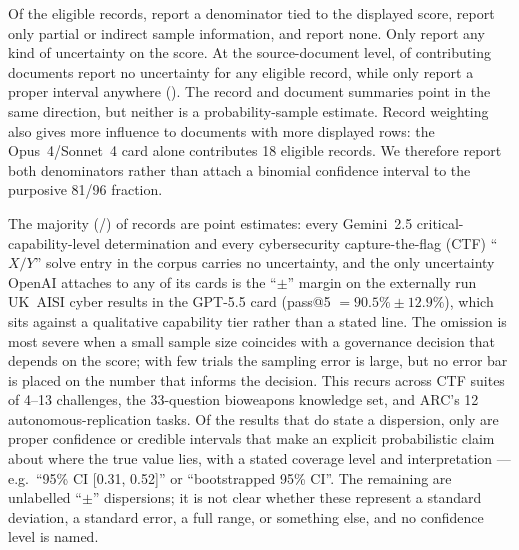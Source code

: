 \documentclass{article}
\begin{document}



Of the \CensusTotal{} eligible records, \CensusScoreN{} report a denominator tied to the displayed score, \CensusPartialN{} report only partial or indirect sample information, and \CensusNoN{} report none. Only \CensusUncertainty{} report any kind of uncertainty on the score. At the source-document level, \CensusSourceNoUncertainty{} of \CensusSourceDocs{} contributing documents report no uncertainty for any eligible record, while only \CensusSourceInterval{} report a proper interval anywhere (). The record and document summaries point in the same direction, but neither is a probability-sample estimate. Record weighting also gives more influence to documents with more displayed rows: the Opus~4/Sonnet~4 card alone contributes 18 eligible records. We therefore report both denominators rather than attach a binomial confidence interval to the purposive 81/96 fraction.

The majority (\CensusNoUncertainty{}/\CensusTotal{}) of records are point estimates: every Gemini~2.5 critical-capability-level determination and every cybersecurity capture-the-flag (CTF) ``$X/Y$'' solve entry in the corpus carries no uncertainty, and the only uncertainty OpenAI
attaches to any of its cards is the ``$\pm$'' margin on the externally run UK~AISI cyber results in the GPT-5.5 card (pass@5 $=90.5\% \pm 12.9\%$), which sits against a qualitative capability tier rather than a stated line. The omission is most severe when a small sample size coincides with a governance decision that depends on the score; with few trials the sampling error is large, but no error bar is placed on the number that informs the decision. This recurs across CTF suites of 4--13 challenges, the 33-question bioweapons knowledge set, and ARC's 12 autonomous-replication tasks. Of the \CensusUncertainty{} results that do state a dispersion, only \CensusInterval{} are proper confidence or credible intervals that make an explicit probabilistic claim about where the true value lies, with a stated coverage level and interpretation --- e.g.\ ``95\% CI [0.31, 0.52]'' or ``bootstrapped 95\% CI''. The remaining \CensusBarePm{} are unlabelled ``$\pm$'' dispersions; it is not clear whether these represent a standard deviation, a standard error, a full range, or something else, and no confidence level is named.
\end{document}
